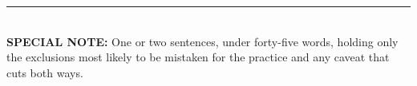 \documentclass[10pt,a4paper]{article}
\newcommand{\specialnote}[1]{%
  \noindent\textcolor{trule}{\rule{\linewidth}{0.4pt}}\\[1.2mm]
  {\footnotesize\textbf{SPECIAL NOTE:} #1}\\[2mm]}
\begin{document}
%
%
\specialnote{One or two sentences, under forty-five words, holding only the exclusions most likely to be
mistaken for the practice and any caveat that cuts both ways.}
 
\end{document}
